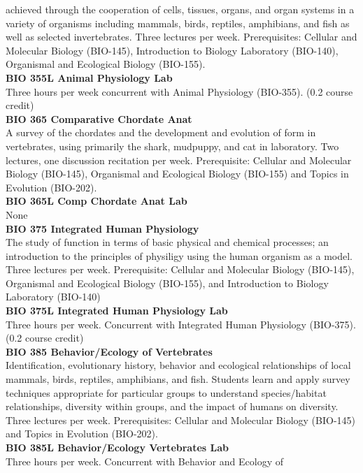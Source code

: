\documentclass[
  letterpaper,
]{scrbook}
\begin{document}
achieved through the cooperation of cells, tissues, organs, and organ
systems in a variety of organisms including mammals, birds, reptiles,
amphibians, and fish as well as selected invertebrates. Three lectures
per week. Prerequisites: Cellular and Molecular Biology (BIO-145),
Introduction to Biology Laboratory (BIO-140), Organismal and Ecological
Biology (BIO-155).\\
\textbf{BIO 355L Animal Physiology Lab}\\
Three hours per week concurrent with Animal Physiology (BIO-355). (0.2
course credit)\\
\textbf{BIO 365 Comparative Chordate Anat}\\
A survey of the chordates and the development and evolution of form in
vertebrates, using primarily the shark, mudpuppy, and cat in laboratory.
Two lectures, one discussion recitation per week. Prerequisite: Cellular
and Molecular Biology (BIO-145), Organismal and Ecological Biology
(BIO-155) and Topics in Evolution (BIO-202).\\
\textbf{BIO 365L Comp Chordate Anat Lab}\\
None\\
\textbf{BIO 375 Integrated Human Physiology}\\
The study of function in terms of basic physical and chemical processes;
an introduction to the principles of physiligy using the human organism
as a model. Three lectures per week. Prerequisite: Cellular and
Molecular Biology (BIO-145), Organismal and Ecological Biology
(BIO-155), and Introduction to Biology Laboratory (BIO-140)\\
\textbf{BIO 375L Integrated Human Physiology Lab}\\
Three hours per week. Concurrent with Integrated Human Physiology
(BIO-375). (0.2 course credit)\\
\textbf{BIO 385 Behavior/Ecology of Vertebrates}\\
Identification, evolutionary history, behavior and ecological
relationships of local mammals, birds, reptiles, amphibians, and fish.
Students learn and apply survey techniques appropriate for particular
groups to understand species/habitat relationships, diversity within
groups, and the impact of humans on diversity. Three lectures per week.
Prerequisites: Cellular and Molecular Biology (BIO-145) and Topics in
Evolution (BIO-202).\\
\textbf{BIO 385L Behavior/Ecology Vertebrates Lab}\\
Three hours per week. Concurrent with Behavior and Ecology of
\end{document}

